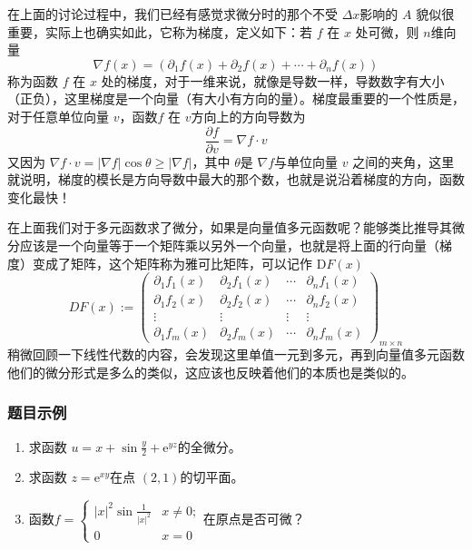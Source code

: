 在上面的讨论过程中，我们已经有感觉求微分时的那个不受 $\Delta x$影响的 $A$ 貌似很重要，实际上也确实如此，它称为梯度，定义如下：若 $f$ 在 $x$ 处可微，则 $n$维向量
$$
\nabla f (x) = (\partial _1 f(x)  + \partial _2 f(x)   + \cdots + \partial _n f(x))
$$
称为函数 $f$ 在 $x$ 处的梯度，对于一维来说，就像是导数一样，导数数字有大小（正负），这里梯度是一个向量（有大小有方向的量）。梯度最重要的一个性质是，对于任意单位向量 $v$，函数$f$ 在 $v$方向上的方向导数为
$$
\frac{\partial f}{\partial v} = \nabla f \cdot v
$$
又因为 $\nabla f \cdot v = |\nabla f| \cos \theta \ge |\nabla f| $，其中 $\theta$是 $\nabla f$与单位向量 $v$ 之间的夹角，这里就说明，梯度的模长是方向导数中最大的那个数，也就是说沿着梯度的方向，函数变化最快！

在上面我们对于多元函数求了微分，如果是向量值多元函数呢？能够类比推导其微分应该是一个向量等于一个矩阵乘以另外一个向量，也就是将上面的行向量（梯度）变成了矩阵，这个矩阵称为雅可比矩阵，可以记作 $\mathrm{D} F(x)$
$$
DF(x):=\left(\begin{array}{cccc}\partial_{1}f_{1}(x)&\partial_{2}f_{1}(x)&\cdots&\partial_{n}f_{1}(x)\\
\partial_{1}f_{2}(x)&\partial_{2}f_{2}(x)&\cdots&\partial_{n}f_{2}(x)\\
\vdots&\vdots&\vdots&\vdots\\
\partial_{1}f_{m}(x)&\partial_{2}f_{m}(x)&\cdots&\partial_{n}f_{m}(x)
\end{array}\right)_{m\times n}
$$
稍微回顾一下线性代数的内容，会发现这里单值一元到多元，再到向量值多元函数他们的微分形式是多么的类似，这应该也反映着他们的本质也是类似的。
\subsubsection{题目示例}
\begin{enumerate}
    \item 求函数 $u = x + \sin \frac{y}{2} + \mathrm{e} ^{yz}$的全微分。
    \item 求函数 $z=\mathrm{e}^{x y}$在点 $(2,1)$的切平面。
    \item 函数$f = \left\{\begin{matrix}
    |x|^2 \sin \frac{1}{|x|^2}& x \ne 0; \\
    0&x=0
    \end{matrix}\right. $在原点是否可微？
\end{enumerate}

